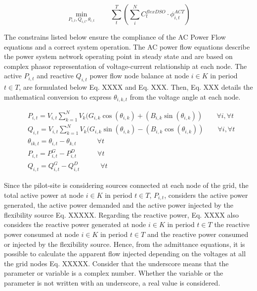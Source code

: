 \begin{equation*}
\!\min_{P_{i,t}, Q_{i,t}, \theta_{i,t}}  \qquad \sum_{t}^{T} \left( \sum_{i}^{N} C_t^{flexDSO} \cdot \phi_{i,t}^{ACT} \right)  
\end{equation*}

The constrains listed below ensure the compliance of the AC Power Flow equations and a correct system operation.
The AC power flow equations describe the power system network operating point in steady state and are based on complex phasor representation of voltage-current relationship at each node. The active $P_{i,t}$ and reactive $Q_{i,t}$ power flow node balance at node $i \in K$ in period  $t \in T$, are formulated below Eq. XXXX and Eq. XXX. Then, Eq. XXX details the mathematical conversion to express  $\theta_{i,k,t}$ from the voltage angle at each node.

\begin{subequations}
\begin{align*}
& P_{i,t} = V_{i,t} \sum_{k=1}^{N} V_{k} (G_{i,k} \cos(\theta_{i,k}) + (B_{i,k} \sin(\theta_{i,k})) \qquad \forall i,\forall t  \\ 
& Q_{i,t} = V_{i,t} \sum_{k=1}^{N} V_{k} (G_{i,k} \sin(\theta_{i,k}) - (B_{i,k} \cos(\theta_{i,k})) \qquad \forall i,\forall t \\
& \theta_{ik,t} = \theta_{i,t} - \theta_{k,t} \quad   \qquad  \forall t \\
& P_{i,t} = P_{i,t}^{G} - P_{i,t}^{D}  \quad   \qquad  \forall t  \\
& Q_{i,t} = Q_{i,t}^{G} - Q_{i,t}^{D}  \quad   \qquad  \forall t  
\end{align*}
\end{subequations}


Since the pilot-site is considering sources connected at each node of the grid, the total active power at node $i \in K$ in period $t \in T$, $P_{i,t}$, considers the active power generated, the active power demanded and the active power injected by the flexibility source Eq. XXXXX. Regarding the reactive power, Eq. XXXX also considers the reactive power generated at node  $i \in K$ in period $t \in T$ the reactive power consumed at node $i \in K$ in period $t \in T$ and the reactive power consumed or injected by the flexibility source.
Hence, from the admittance equations, it is possible to calculate the apparent flow injected depending on the voltages at all the grid nodes Eq. XXXXX. Consider that the underscore means that the parameter or variable is a complex number. Whether the variable or the parameter is not written with an underscore, a real value is considered.

